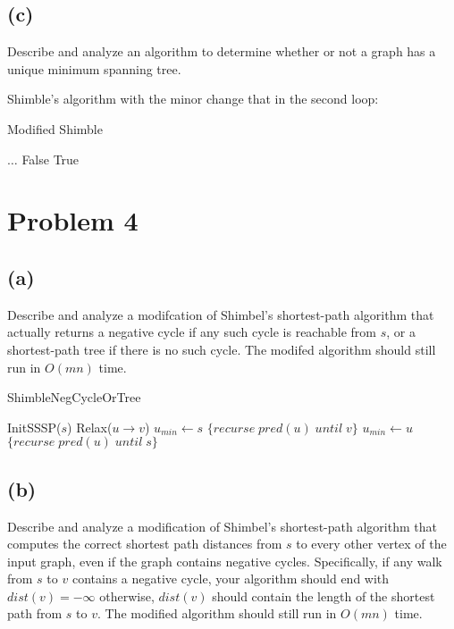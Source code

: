\documentclass[12pt]{article}
\begin{document}
\subsection*{(c)}
Describe and analyze an algorithm to determine whether or not a graph
has a unique minimum spanning tree.

Shimble's algorithm with the minor change that in the second loop:
\begin{algorithm}
\caption{Modified Shimble}
\begin{algorithmic}
  \STATE
  \STATE $\ldots$
  \STATE
      \RETURN False
    \ENDIF
  \RETURN True
  \ENDFOR
\end{algorithmic}
\end{algorithm}


\pagebreak

\section*{Problem 4}

\subsection*{(a)}
Describe and analyze a modifcation of Shimbel's shortest-path algorithm
that actually returns a negative cycle if any such cycle is reachable
from $s$, or a shortest-path tree if there is no such cycle. The modifed
algorithm should still run in $O(mn)$ time.

\begin{algorithm}
\caption{ShimbleNegCycleOrTree}
\begin{algorithmic}
    \STATE InitSSSP($s$)
                \STATE Relax($u \rightarrow v$)
            \ENDIF
        \ENDFOR
    \ENDFOR
    \STATE $u_{min} \leftarrow s$
            \RETURN $\{ recurse\; pred(u)\; until\; v \}$
        \ENDIF
            \STATE $u_{min} \leftarrow u$
        \ENDIF
        \RETURN $\{ recurse\; pred(u)\; until\; s \}$
    \ENDFOR
\end{algorithmic}
\end{algorithm}

\pagebreak

\subsection*{(b)}
Describe and analyze a modification of Shimbel's shortest-path
algorithm that computes the correct shortest path distances from $s$ to
every other vertex of the input graph, even if the graph contains
negative cycles. Specifically, if any walk from $s$ to $v$ contains a
negative cycle, your algorithm should end with $dist(v) = -\infty$
otherwise, $dist(v)$ should contain the length of the shortest path
from $s$ to $v$. The modified algorithm should still run in $O(mn)$
time.
\end{document}
